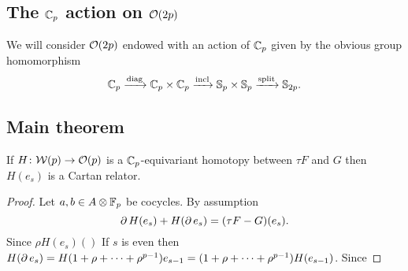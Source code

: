 \subsection{The $\mathbb{C}_p$ action on $\mathcal{O}(2p)$}\label{ss:cyclic action}

We will consider $\mathcal{O}(2p)$ endowed with an action of $\mathbb{C}_p$ given by the obvious group homomorphism
\[
\mathbb{C}_p \xrightarrow{\mathrm{diag}} \mathbb{C}_p \times \mathbb{C}_p \xrightarrow{\mathrm{incl}} \mathbb{S}_p \times \mathbb{S}_p \xrightarrow{\mathrm{split}} \mathbb{S}_{2p}.
\]

\subsection{Main theorem}

If $H \colon \mathcal{W}(p) \to \mathcal{O}(p)$ is a $\mathbb{C}_p$-equivariant homotopy between $\tau F$ and $G$ then
$H(e_s)$ is a Cartan relator.

\begin{proof}
	Let $a, b \in A \otimes {\mathbb{F}_p}$ be cocycles.
	By assumption
	\[
	\operatorname{\partial} H(e_s) + H(\operatorname{\partial} e_s) = (\tau F - G)(e_s).
	\]
	Since $\rho H(e_s)()$
	If $s$ is even then $H(\operatorname{\partial} e_s) = H(1+\rho+\dots+\rho^{p-1})e_{s-1} = (1+\rho+\dots+\rho^{p-1})H(e_{s-1})$.
	Since
\end{proof}